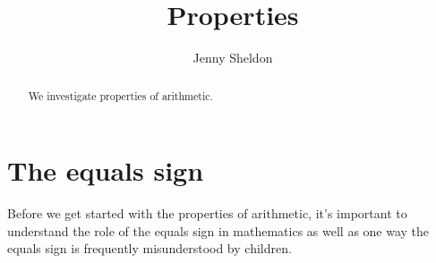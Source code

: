\documentclass{ximera}
\title{Properties}
\author{Jenny Sheldon}
\begin{document}
\begin{abstract}
We investigate properties of arithmetic.
\end{abstract}
\maketitle





\section{The equals sign}

Before we get started with the properties of arithmetic, it's important to understand the role of the equals sign in mathematics as well as one way the equals sign is frequently misunderstood by children. 
\end{document}
